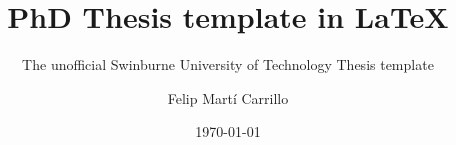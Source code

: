 \documentclass{class/fsetswin-phd}
\author{
	Felip Mart\'{i} Carrillo 
}
\title{PhD Thesis template in LaTeX}
\subtitle{The unofficial Swinburne University of Technology Thesis template}
\date{\mydate\today}
\begin{document}
    \makefrontmatter


    \cleardoublepage


    \ifdefined\isdraft
        \doublespacing
    \fi

    

    

    




    
    \begin{appendices}

        

        


    \end{appendices}
\end{document}
